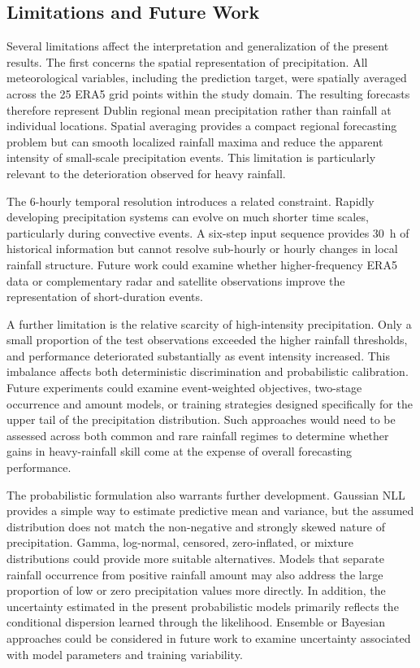 \documentclass[referee,pdflatex,sn-basic]{sn-jnl}%
\theoremstyle{thmstyleone}%
\theoremstyle{thmstyletwo}%
\theoremstyle{thmstylethree}%
\begin{document}
\subsection{Limitations and Future Work}

Several limitations affect the interpretation and generalization of the present results. The first concerns the spatial representation of precipitation. All meteorological variables, including the prediction target, were spatially averaged across the 25 ERA5 grid points within the study domain. The resulting forecasts therefore represent Dublin regional mean precipitation rather than rainfall at individual locations. Spatial averaging provides a compact regional forecasting problem but can smooth localized rainfall maxima and reduce the apparent intensity of small-scale precipitation events. This limitation is particularly relevant to the deterioration observed for heavy rainfall.

The 6-hourly temporal resolution introduces a related constraint. Rapidly developing precipitation systems can evolve on much shorter time scales, particularly during convective events. A six-step input sequence provides 30~h of historical information but cannot resolve sub-hourly or hourly changes in local rainfall structure. Future work could examine whether higher-frequency ERA5 data or complementary radar and satellite observations improve the representation of short-duration events.

A further limitation is the relative scarcity of high-intensity precipitation. Only a small proportion of the test observations exceeded the higher rainfall thresholds, and performance deteriorated substantially as event intensity increased. This imbalance affects both deterministic discrimination and probabilistic calibration. Future experiments could examine event-weighted objectives, two-stage occurrence and amount models, or training strategies designed specifically for the upper tail of the precipitation distribution. Such approaches would need to be assessed across both common and rare rainfall regimes to determine whether gains in heavy-rainfall skill come at the expense of overall forecasting performance.

The probabilistic formulation also warrants further development. Gaussian NLL provides a simple way to estimate predictive mean and variance, but the assumed distribution does not match the non-negative and strongly skewed nature of precipitation. Gamma, log-normal, censored, zero-inflated, or mixture distributions could provide more suitable alternatives. Models that separate rainfall occurrence from positive rainfall amount may also address the large proportion of low or zero precipitation values more directly. In addition, the uncertainty estimated in the present probabilistic models primarily reflects the conditional dispersion learned through the likelihood. Ensemble or Bayesian approaches could be considered in future work to examine uncertainty associated with model parameters and training variability.
\end{document}
